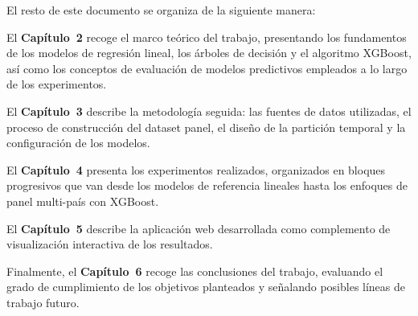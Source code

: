 El resto de este documento se organiza de la siguiente manera:

El \textbf{Capítulo~2} recoge el marco teórico del trabajo, presentando los fundamentos de los modelos de regresión lineal, los árboles de decisión y el algoritmo XGBoost, así como los conceptos de evaluación de modelos predictivos empleados a lo largo de los experimentos.

El \textbf{Capítulo~3} describe la metodología seguida: las fuentes de datos utilizadas, el proceso de construcción del dataset panel, el diseño de la partición temporal y la configuración de los modelos.

El \textbf{Capítulo~4} presenta los experimentos realizados, organizados en bloques progresivos que van desde los modelos de referencia lineales hasta los enfoques de panel multi-país con XGBoost.

El \textbf{Capítulo~5} describe la aplicación web desarrollada como complemento de visualización interactiva de los resultados.

Finalmente, el \textbf{Capítulo~6} recoge las conclusiones del trabajo, evaluando el grado de cumplimiento de los objetivos planteados y señalando posibles líneas de trabajo futuro.